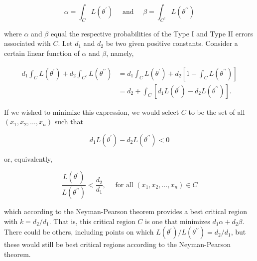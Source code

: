 $$
\alpha=\int_{C} L\left(\theta^{\prime}\right) \quad \text { and } \quad \beta=\int_{C^{c}} L\left(\theta^{\prime \prime}\right)
$$

where $\alpha$ and $\beta$ equal the respective probabilities of the Type I and Type II errors associated with $C$. Let $d_{1}$ and $d_{2}$ be two given positive constants. Consider a certain linear function of $\alpha$ and $\beta$, namely,

$$
\begin{aligned}
d_{1} \int_{C} L\left(\theta^{\prime}\right)+d_{2} \int_{C^{c}} L\left(\theta^{\prime \prime}\right) & =d_{1} \int_{C} L\left(\theta^{\prime}\right)+d_{2}\left[1-\int_{C} L\left(\theta^{\prime \prime}\right)\right] \\
& =d_{2}+\int_{C}\left[d_{1} L\left(\theta^{\prime}\right)-d_{2} L\left(\theta^{\prime \prime}\right)\right] .
\end{aligned}
$$

If we wished to minimize this expression, we would select $C$ to be the set of all $\left(x_{1}, x_{2}, \ldots, x_{n}\right)$ such that

$$
d_{1} L\left(\theta^{\prime}\right)-d_{2} L\left(\theta^{\prime \prime}\right)<0
$$

or, equivalently,

$$
\frac{L\left(\theta^{\prime}\right)}{L\left(\theta^{\prime \prime}\right)}<\frac{d_{2}}{d_{1}}, \quad \text { for all }\left(x_{1}, x_{2}, \ldots, x_{n}\right) \in C
$$

which according to the Neyman-Pearson theorem provides a best critical region with $k=d_{2} / d_{1}$. That is, this critical region $C$ is one that minimizes $d_{1} \alpha+d_{2} \beta$. There could be others, including points on which $L\left(\theta^{\prime}\right) / L\left(\theta^{\prime \prime}\right)=d_{2} / d_{1}$, but these would still be best critical regions according to the Neyman-Pearson theorem.

